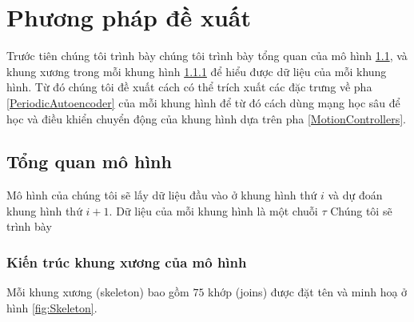 %   

\chapter{Phương pháp đề xuất}
\label{Chapter3}


Trước tiên chúng tôi trình bày chúng tôi trình bày tổng quan của mô hình \ref{Overview},  và khung xương trong mỗi khung hình \ref{Skeleton} để hiểu được dữ liệu của mỗi khung hình. Từ đó chúng tôi đề xuất cách có thể trích xuất các đặc trưng về pha \ref{PeriodicAutoencoder} của mỗi khung hình để từ đó cách dùng mạng học sâu để học và điều khiển chuyển động của khung hình dựa trên pha \ref{MotionControllers}.

\section{Tổng quan mô hình}
\label{Overview}

Mô hình của chúng tôi sẽ lấy dữ liệu đầu vào ở khung hình thứ $i$ và dự đoán khung hình thứ $i+1$. Dữ liệu của mỗi khung hình là một chuỗi $\tau$ Chúng tôi sẽ trình bày

\subsection{Kiến trúc khung xương của mô hình}
\label{Skeleton}

Mỗi khung xương (skeleton) bao gồm $75$ khớp (joins) được đặt tên và minh hoạ ở hình \ref{fig:Skeleton}. 

